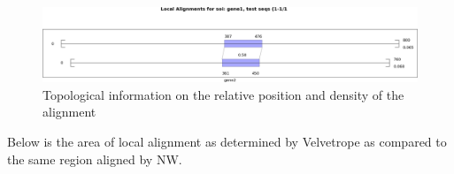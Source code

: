 \documentclass[phd,tocprelim]{cornell}
\begin{document}
\pagebreak

\begin{figure}[hpt]
	\centering
		\includegraphics[width=1.0\textwidth]{figures/velvetrope/hmm1_2.png}
        \caption[Topological information of NW HMM test]{Topological information on the relative position and density of the alignment}
	\label{fig:06}
\end{figure}

Below is the area of local alignment as determined by Velvetrope as compared to the same region aligned by NW.
\end{document}
